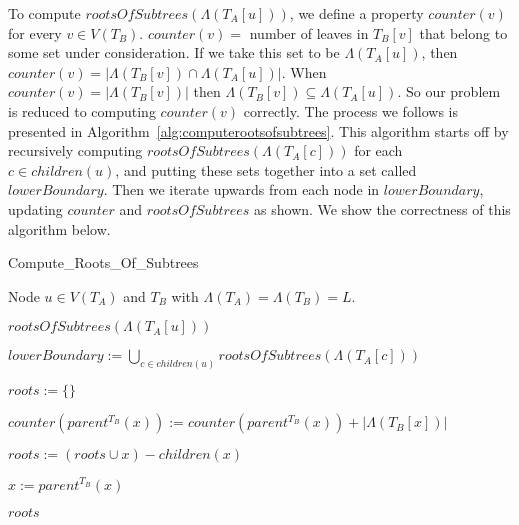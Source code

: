 \documentclass{article}
\newcommand{\leafset}{\Lambda}
\begin{document}
    To compute $rootsOfSubtrees(\leafset(T_A[u]))$, we define a property $counter(v)$ for every $v \in V(T_B)$. $counter(v) =$ number of leaves in $T_B[v]$ that belong to some set under consideration. If we take this set to be $\leafset(T_A[u])$, then $counter(v) = |\leafset(T_B[v]) \cap \leafset(T_A[u])|$. When $counter(v) = |\leafset(T_B[v])|$ then $\leafset(T_B[v]) \subseteq \leafset(T_A[u])$. So our problem is reduced to computing $counter(v)$ correctly. The process we follows is presented in Algorithm~\ref{alg:computerootsofsubtrees}. This algorithm starts off by recursively computing $rootsOfSubtrees(\leafset(T_A[c]))$ for each $c \in children(u)$, and putting these sets together into a set called $lowerBoundary$. Then we iterate upwards from each node in $lowerBoundary$, updating $counter$ and $rootsOfSubtrees$ as shown. We show the correctness of this algorithm below.

    \begin{algorithm}
        \caption{Compute\_Roots\_Of\_Subtrees}
        \label{alg:computerootsofsubtrees}

        \begin{algorithmic}[1]
            \Input Node $u \in V(T_A)$ and $T_B$ with $\leafset(T_A) = \leafset(T_B) = L$.

            \Output $rootsOfSubtrees(\leafset(T_A[u]))$

            \State $lowerBoundary := \bigcup_{c \in children(u)} rootsOfSubtrees(\leafset(T_A[c]))$

            \State $roots := \{\}$

                \While{$counter(x) = |\leafset(T_B[x])|$}
                    \State $counter(parent^{T_B}(x)) := counter(parent^{T_B}(x)) + |\leafset(T_B[x])|$

                    \State $roots := (roots \cup {x}) - children(x)$

                    \State $x := parent^{T_B}(x)$
                \EndWhile
            \EndFor

            \State \Return $roots$
        \end{algorithmic}
    \end{algorithm}

    \newpage
\end{document}
